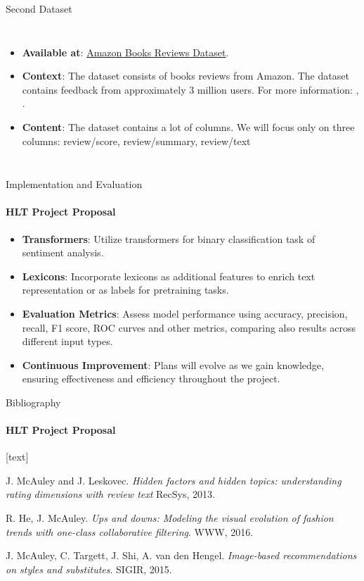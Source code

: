 \documentclass{beamer}
\theoremstyle{definition}
\theoremstyle{plain}
\begin{document}
\begin{frame}{Second Dataset}
{\begin{columns}
    \begin{itemize}
        \item \textbf{Available at}: \textcolor{teal}{\href{https://www.kaggle.com/datasets/mohamedbakhet/amazon-books-reviews}{Amazon Books Reviews Dataset}}.
        \item \textbf{Context}: The dataset consists of books reviews from Amazon. The dataset contains feedback from approximately 3 million users. For more information: \cite{3}, \cite{4}.
        \item \textbf{Content}: The dataset contains a lot of columns. We will focus only on three columns: review/score, review/summary, review/text
    \end{itemize}

\end{columns}
}
\end{frame}

\begin{frame}{Implementation and Evaluation}
\framesubtitle{HLT Project Proposal}
{\small
\begin{itemize}
\item \textbf{Transformers}: Utilize transformers for binary classification task of sentiment analysis.

\item \textbf{Lexicons}: Incorporate lexicons as additional features to enrich text representation or as labels for pretraining tasks.

\item \textbf{Evaluation Metrics}: Assess model performance using accuracy, precision, recall, F1 score, ROC curves and other metrics, comparing also results across different input types.

\item \textbf{Continuous Improvement}: Plans will evolve as we gain knowledge, ensuring effectiveness and efficiency throughout the project.
\end{itemize}
}
\end{frame}

\begin{frame}{Bibliography}
\framesubtitle{HLT Project Proposal}

\begin{thebibliography}{9}
[text]

 J. McAuley and J. Leskovec. \emph{Hidden factors and hidden topics: understanding rating dimensions with review text} RecSys, 2013.

 R. He, J. McAuley. \emph{Ups and downs: Modeling the visual evolution of fashion trends with one-class collaborative filtering}. WWW, 2016.

J. McAuley, C. Targett, J. Shi, A. van den Hengel. \emph{Image-based recommendations on styles and substitutes}. SIGIR, 2015.


\end{thebibliography}
    
\end{frame}

\backmatter
\end{document}
